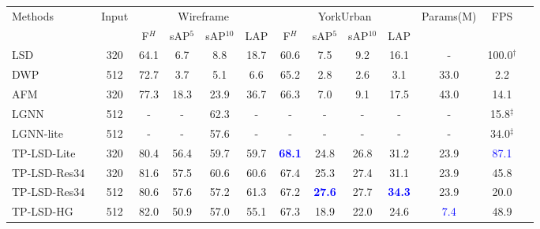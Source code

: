 \documentclass[letterpaper]{article} \usepackage{aaai22}  \usepackage{times}  \usepackage{helvet}  \usepackage{courier}  \usepackage[hyphens]{url}  \usepackage{graphicx} \urlstyle{rm} \def\UrlFont{\rm}  \usepackage{natbib}  \usepackage{caption} \DeclareCaptionStyle{ruled}{labelfont=normalfont,labelsep=colon,strut=off} \frenchspacing  \setlength{\pdfpagewidth}{8.5in}  \setlength{\pdfpageheight}{11in}  \usepackage{algorithm}
\begin{document}
\begin{table*}[t!]
\centering
\begin{adjustbox}{width=0.8\textwidth,center}
\begin{tabular}{lcccccccccccc}
\toprule
\multirow{2}{*}{Methods} & \multirow{2}{*}{Input} & \multicolumn{4}{c}{Wireframe} & \multicolumn{4}{c}{YorkUrban} & \multirow{2}{*}{Params(M)} & \multirow{2}{*}{FPS} \\ \cline{3-10}
                         &                        & F$^H$   & sAP$^5$ & sAP$^{10}$ & LAP  & F$^H$   & sAP$^5$ & sAP$^{10}$ & LAP  &                            &                      \\
\midrule
LSD~\cite{von2008lsd}    & 320                    & 64.1  & 6.7   & 8.8    & 18.7 & 60.6  & 7.5   & 9.2    & 16.1 & -                           & 100.0$^{\dagger}$                \\
DWP~\cite{huang2018learning}& 512                    & 72.7  & 3.7     & 5.1    & 6.6  & 65.2  & 2.8     & 2.6    & 3.1  & 33.0                       & 2.2                  \\
AFM~\cite{xue2019learning}& 320                    & 77.3  & 18.3  & 23.9   & 36.7 & 66.3  & 7.0   & 9.1    & 17.5 & 43.0                       & 14.1                 \\
LGNN~\cite{meng2020lgnn} & 512                    & -     & -     & 62.3   & -    & -     & -     & -      & -    & -                           & 15.8$^{\ddagger}$                 \\
LGNN-lite~\cite{meng2020lgnn}& 512                    & -     & -     & 57.6   & -    & -     & -     & -      & -    & -                          & 34.0$^{\ddagger}$                 \\
TP-LSD-Lite~\cite{huang2020tp}& 320                    & 80.4  & 56.4  & 59.7   & 59.7 & \textcolor{blue}{\textbf{68.1}}  & 24.8  & 26.8   & 31.2 & 23.9                       & \textcolor{blue}{87.1}                 \\
TP-LSD-Res34~\cite{huang2020tp}& 320                    & 81.6  & 57.5  & 60.6   & 60.6 & 67.4  & 25.3  & 27.4   & 31.1 & 23.9                       & 45.8                 \\
TP-LSD-Res34~\cite{huang2020tp}& 512                    & 80.6  & 57.6  & 57.2   & 61.3 & 67.2  & \textcolor{blue}{\textbf{27.6}}  & 27.7   & \textcolor{blue}{\textbf{34.3}} & 23.9                       & 20.0                 \\
TP-LSD-HG~\cite{huang2020tp}& 512                    & 82.0  & 50.9  & 57.0   & 55.1 & 67.3  & 18.9  & 22.0   & 24.6 & \textcolor{blue}{7.4}                        & 48.9                 \\

\end{tabular}
\end{adjustbox}
\end{table*}
\end{document}
